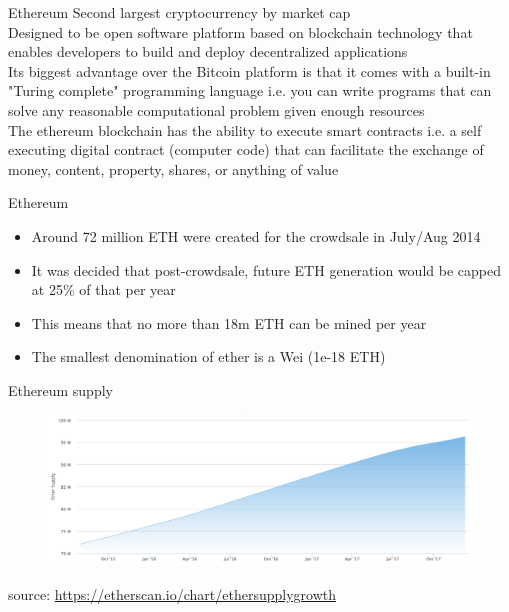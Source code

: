 \documentclass[9pt]{beamer}
\begin{document}

\begin{frame}{Ethereum}
	Second largest cryptocurrency by market cap \\ \vspace{3mm}
	Designed to be open software platform based on blockchain technology that enables developers to build and deploy decentralized applications\\ \vspace{3mm}
	Its biggest advantage over the Bitcoin platform is that it comes with a built-in "Turing complete" programming language i.e. you can write programs that can solve any reasonable computational problem given enough resources\\ \vspace{3mm}
	The ethereum blockchain has the ability to execute smart contracts i.e. a self executing digital contract (computer code) that can facilitate the exchange of money, content, property, shares, or anything of value
\end{frame}


\begin{frame}{Ethereum}
	\begin{itemize}
		\item Around 72 million ETH were created for the crowdsale in July/Aug 2014
		\item It was decided that post-crowdsale, future ETH generation would be capped at 25\% of that per year
		\item This means that no more than 18m ETH can be mined per year
		\item The smallest denomination of ether is a Wei (1e-18 ETH)
	\end{itemize}
\end{frame}


\begin{frame}{Ethereum supply}
	\begin{figure}[]
		\centering
		\includegraphics  [scale=0.25]{Images/eth-supply}
	\end{figure}
	\begin{scriptsize}
		source: \href{https://etherscan.io/chart/ethersupplygrowth}{https://etherscan.io/chart/ethersupplygrowth}
	\end{scriptsize}
\end{frame}
\end{document}
